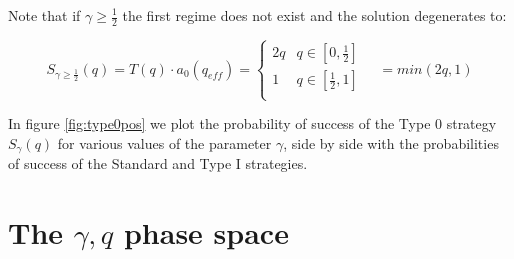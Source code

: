 \documentclass[letterpaper,12pt]{report}
\begin{document}
Note that if $\gamma\geq\frac{1}{2}$ the first regime does not exist and the solution degenerates to:

\begin{equation}\label{eq:sofq2}
S_{\gamma\geq\frac{1}{2}}(q)=T(q)\cdot a_0(q_{eff})=
\begin{cases}
2q & q\in [0,\frac{1}{2}] \\ 
1 & q\in [\frac{1}{2},1] \\ 
\end{cases} \quad = min(2q,1)
\end{equation}

In figure \ref{fig:type0pos} we plot the probability of success of the Type 0 strategy $S_\gamma(q)$ for various values of the parameter $\gamma$, side by side with the probabilities of success of the Standard and Type I strategies.

\noindent%
\begin{minipage}{\linewidth}
\label{fig:type0pos}
\end{minipage}
\linebreak

\chapter{The $\gamma,q$ phase space}\label{chap:gqphase}
\end{document}
